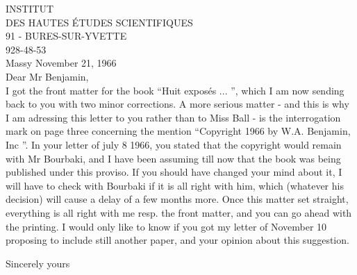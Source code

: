 INSTITUT\\
DES HAUTES ÉTUDES SCIENTIFIQUES\\
91 - BURES-SUR-YVETTE\\
928-48-53\\

Massy November 21, 1966\\

Dear Mr Benjamin,\\

I got the front matter for the book ``Huit exposés ... '', which I am now sending back to you with two minor corrections. A more serious matter - and this is why I am adressing this letter to you rather than to Miss Ball  - is the interrogation mark on page three concerning the mention ``Copyright 1966 by W.A. Benjamin, Inc ''. In your letter of july 8 1966, you stated that the copyright would remain with Mr Bourbaki, and I have been assuming till now that the book was being published under this proviso. If you should have changed your mind about it, I will have to check with Bourbaki if it is all right with him, which (whatever his decision) will cause a delay of a few months more. Once this matter set straight, everything is all right with me resp. the front matter, and you can go ahead with the printing. I would only like to know if you got my letter of November 10 proposing to include still another paper, and your opinion about this suggestion.

Sincerely yours\\


